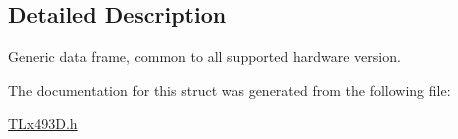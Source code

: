 \subsection{Detailed Description}
Generic data frame, common to all supported hardware version. 

The documentation for this struct was generated from the following file\+:\begin{DoxyCompactItemize}
\item 
\mbox{\hyperlink{_t_lx493_d_8h}{T\+Lx493\+D.\+h}}\end{DoxyCompactItemize}

